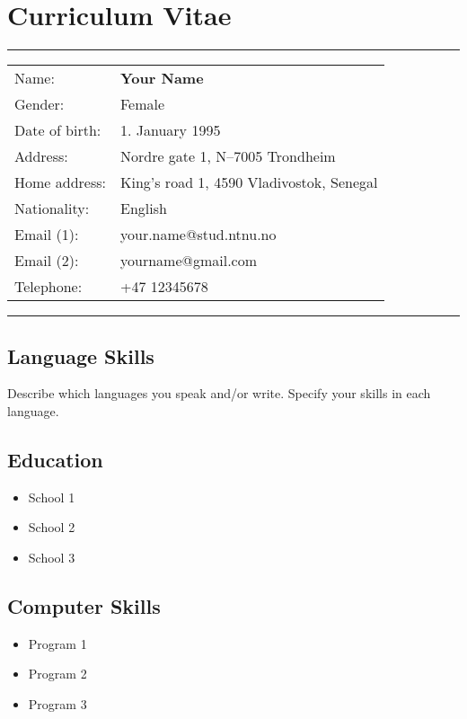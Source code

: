 \chapter*{Curriculum Vitae}
\hrule
\begin{minipage}[t]{0.65\linewidth}
\begin{tabular}{ll}
Name: & \textbf{Your Name}\\
Gender: & Female\\
Date of birth: & 1. January 1995\\
Address: & Nordre gate 1, N--7005 Trondheim \\
Home address: & King's road 1, 4590 Vladivostok, Senegal\\
Nationality:    & English \\
Email (1): & your.name@stud.ntnu.no\\
Email (2): & yourname@gmail.com\\
Telephone: & +47 12345678\\
\end{tabular} 
\end{minipage}\hfill
\begin{minipage}[t]{0.25\linewidth}
\end{minipage}
\hrule

\section*{Language Skills}
Describe which languages you speak and/or write. Specify your skills in each language.

\section*{Education}
\begin{itemize}
\item School 1
\item School 2
\item School 3
\end{itemize}

\section*{Computer Skills}
\begin{itemize}
\item Program 1
\item Program 2
\item Program 3
\end{itemize}

